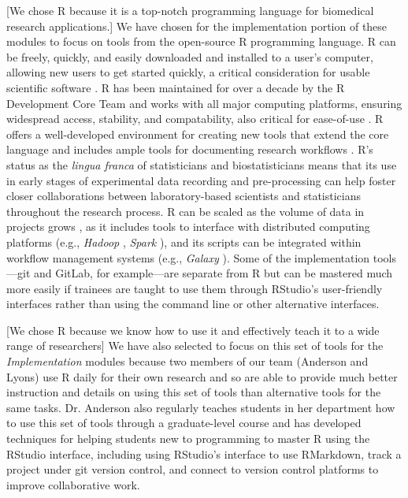 \documentclass[pdftex,english,11pt,parskip=half]{scrartcl}
\begin{document}
[We chose R because it is a top-notch programming language for biomedical
research applications.] We have chosen for the implementation portion of these
modules to focus on tools from the open-source R programming language. R can be
freely, quickly, and easily downloaded and installed to a user's computer,
allowing new users to get started quickly, a critical consideration for usable
scientific software \cite{list2017ten}. R has been maintained for over a decade
by the R Development Core Team and works with all major computing platforms,
ensuring  widespread access, stability, and compatability, also critical for
ease-of-use \cite{baumer2017lessons, altschul2013anatomy}. R offers a
well-developed environment for creating new tools that extend the core language
\cite{wickham2015r} and includes ample tools for documenting research workflows
\cite{xie2015dynamic, xie2016bookdown}. R's status as the \textit{lingua franca}
of statisticians and biostatisticians means that its use in early stages of
experimental data recording and pre-processing can help foster closer
collaborations between laboratory-based scientists and statisticians throughout
the research process. R can be scaled as the volume of data in projects grows
\cite{list2017ten}, as it includes tools to interface with distributed computing
platforms (e.g., \textit{Hadoop} \cite{pathak2014rhadoop}, \textit{Spark}
\cite{sparklyr}), and its scripts can be integrated within workflow management
systems (e.g., \textit{Galaxy} \cite{goecks2010galaxy, walker2016models}). Some
of the implementation tools---git and GitLab, for example---are separate from R
but can be mastered much more easily if trainees are taught to use them through
RStudio's user-friendly interfaces rather than using the command line or other
alternative interfaces.

[We chose R because we know how to use it and effectively teach it to a wide
range of researchers] We have also selected to focus on this set of tools for
the \textit{Implementation} modules because two members of our team (Anderson
and Lyons) use R daily for their own research and so are able to provide much
better instruction and details on using this set of tools than alternative tools
for the same tasks. Dr. Anderson also regularly teaches students in her
department how to use this set of tools through a graduate-level course and has
developed techniques for helping students new to programming to master R using
the RStudio interface, including using RStudio's interface to use RMarkdown,
track a project under git version control, and connect to version control
platforms to improve collaborative work. 
\end{document}
